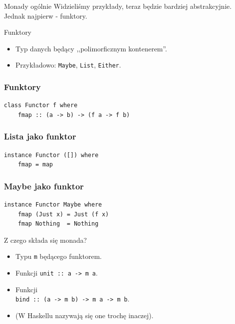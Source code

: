 \documentclass[14pt]{beamer}
\begin{document}

\begin{frame}{Monady ogólnie}
    Widzieliśmy przykłady, teraz będzie bardziej abstrakcyjnie.
    Jednak najpierw - funktory.
\end{frame}

\begin{frame}{Funktory}
    \begin{itemize}
        \item Typ danych będący ,,polimorficznym kontenerem''.
        \item Przykładowo: \texttt{Maybe}, \texttt{List}, \texttt{Either}.
    \end{itemize}
\end{frame}

\begin{frame}[fragile]
\frametitle{Funktory}
\begin{verbatim}
class Functor f where
    fmap :: (a -> b) -> (f a -> f b)
\end{verbatim}
\end{frame}

\begin{frame}[fragile]
\frametitle{Lista jako funktor}
\begin{verbatim}
instance Functor ([]) where
    fmap = map
\end{verbatim}
\end{frame}

\begin{frame}[fragile]
\frametitle{Maybe jako funktor}
\begin{verbatim}
instance Functor Maybe where
    fmap (Just x) = Just (f x)
    fmap Nothing  = Nothing
\end{verbatim}
\end{frame}

\begin{frame}{Z czego składa się monada?}
    \begin{itemize}
        \item Typu \texttt{m} będącego funktorem.
        \item Funkcji \texttt{unit :: a -> m a}.
        \item Funkcji\\
            \texttt{bind :: (a -> m b) -> m a -> m b}.
        \pause
        \item (W Haskellu nazywają się one trochę inaczej).
    \end{itemize}
\end{frame}
\end{document}
